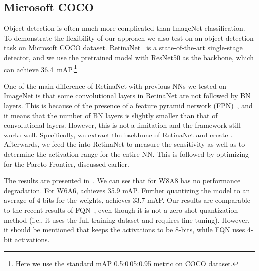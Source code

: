 \subsection{Microsoft COCO}
\label{sec:objective_detection_result}
Object detection is often much more complicated than ImageNet classification. To demonstrate the flexibility of our approach we also test \OURS on an object detection task on Microsoft COCO dataset. 
RetinaNet~\cite{lin2017focal} is a state-of-the-art single-stage detector,
and we use the pretrained model with ResNet50 as the backbone, which can achieve 36.4~mAP.\footnote{Here we use the standard mAP 0.5:0.05:0.95 metric on COCO dataset.}

One of the main difference of RetinaNet with previous NNs we tested on ImageNet is that some convolutional layers in RetinaNet are not followed by BN layers.
This is because of the presence of a feature pyramid network (FPN)~\cite{DBLP:journals/corr/LinDGHHB16}, and it means that the number of BN layers is slightly smaller than that of convolutional layers. 
However, this is not a limitation and the \OURS framework still works well.
Specifically, we extract the backbone of RetinaNet and create \rg.
Afterwards, we feed the \rg into RetinaNet to measure the sensitivity as well as to determine the activation range for the entire NN. 
This is followed by optimizing for the Pareto Frontier, discussed earlier. 

The results are presented in~.
We can see that for W8A8 \OURS has no performance degradation. 
For W6A6, \OURS achieves 35.9 mAP.
Further quantizing the model to an average of 4-bits for the weights, \OURS achieves 33.7 mAP.
Our results are comparable to the recent results of FQN~\cite{li2019fully}, even
though it is not a zero-shot quantization method (i.e., it uses the full training dataset and requires fine-tuning). 
However, it should be mentioned that \OURS keeps the activations to be 8-bits, while FQN uses 4-bit activations. 


